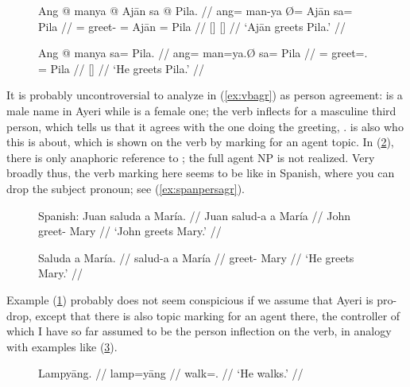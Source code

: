 \begin{figure}[h]
\pex\label{ex:ayrpersagr} %
\a\label{ex:vbagr}\begingl
	\gla Ang @ manya {} @ Ajān sa @ Pila. //
	\glb ang= man-ya Ø= Ajān sa= Pila //
	\glc \AgtT{}= greet-\TsgM{} \Top{}= ​Ajān \Parg{}= Pila //
	\glc {} {} {} [\TsgM{}] {} [\TsgF{}] //
	\glft `Ajān greets Pila.' //
\endgl

\a\label{ex:vbclt}\begingl
	\gla Ang @ manya sa= Pila. //
	\glb ang= man=ya.Ø sa= ​Pila //
	\glc \AgtT{}= greet=\TsgM{}.\Top{} \Parg{}= ​Pila //
	\glc {} {} {} [\TsgF{}] //
	\glft `He greets Pila.' //
\endgl
\xe
\end{figure}

It is probably uncontroversial to analyze  in (\ref{ex:vbagr}) as
person agreement:  is a male name in Ayeri while
 is a female one; the verb inflects for a masculine third
person, which tells us that it agrees with the one doing the greeting,
.  is also who this is about, which is
shown on the verb by marking for an agent topic. In (\ref{ex:vbagrspapr}),
there is only anaphoric reference to ; the full agent NP is
not realized. Very broadly thus, the verb marking here seems to be like in
Spanish, where you can drop the subject pronoun; see (\ref{ex:spanpersagr}).

\begin{figure}[h]
\pex\label{ex:spanpersagr}%
Spanish:
\a\label{ex:vbagrspann}\begingl
	\gla Juan saluda a María. //
	\glb Juan salud-a a María //
	\glc John greet-\Tsg{} \Acc{} Mary //
	\glft `John greets Mary.' //
\endgl

\a\label{ex:vbagrspapr}\begingl
	\gla Saluda a María. //
	\glb salud-a a María //
	\glc greet-\Tsg{} \Acc{} Mary //
	\glft `He greets Mary.' //
\endgl
\xe
\end{figure}

Example (\ref{ex:vbclt}) probably does not seem conspicious if we assume that
Ayeri is pro-drop, except that there is also topic marking for an agent there,
the controller of which I have so far assumed to be the person inflection on
the verb, in analogy with examples like (\ref{ex:lampyaang}).

\begin{figure}[h]
\ex\label{ex:lampyaang} %
\begingl
	\gla Lampyāng. //
	\glb lamp=yāng //
	\glc walk=\TsgM{}.\Aarg{} //
	\glft `He walks.' //
\endgl\xe
\end{figure}

